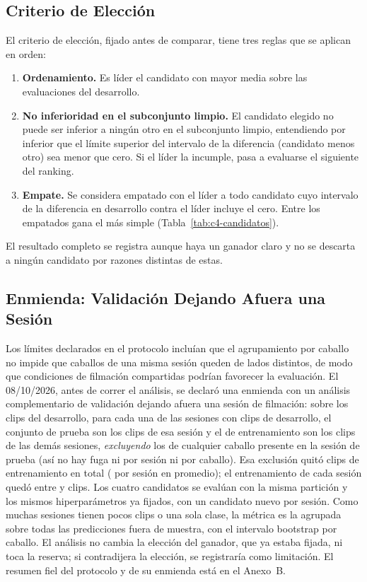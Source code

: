 \subsection{Criterio de Elección}
El criterio de elección, fijado antes de comparar, tiene tres reglas que se aplican en orden:

\begin{enumerate}
  \item \textbf{Ordenamiento.} Es líder el candidato con mayor \fmacro{} media sobre las \Evaluaciones{} evaluaciones del desarrollo.
  \item \textbf{No inferioridad en el subconjunto limpio.} El candidato elegido no puede ser inferior a ningún otro en el subconjunto limpio, entendiendo por inferior que el límite superior del intervalo de la diferencia (candidato menos otro) sea menor que cero. Si el líder la incumple, pasa a evaluarse el siguiente del ranking.
  \item \textbf{Empate.} Se considera empatado con el líder a todo candidato cuyo intervalo de la diferencia en desarrollo contra el líder incluye el cero. Entre los empatados gana el más simple (Tabla~\ref{tab:c4-candidatos}).
\end{enumerate}

El resultado completo se registra aunque haya un ganador claro y no se descarta a ningún candidato por razones distintas de estas.

\subsection{Enmienda: Validación Dejando Afuera una Sesión}
Los límites declarados en el protocolo incluían que el agrupamiento por caballo no impide que caballos de una misma sesión queden de lados distintos, de modo que condiciones de filmación compartidas podrían favorecer la evaluación. El 08/10/2026, antes de correr el análisis, se declaró una enmienda con un análisis complementario de validación dejando afuera una sesión de filmación: sobre los \ClipsDesarrollo{} clips del desarrollo, para cada una de las \SesionesEvaluadas{} sesiones con clips de desarrollo, el conjunto de prueba son los clips de esa sesión y el de entrenamiento son los clips de las demás sesiones, \textit{excluyendo} los de cualquier caballo presente en la sesión de prueba (así no hay fuga ni por sesión ni por caballo). Esa exclusión quitó \ClipsTrainPerdidos{} clips de entrenamiento en total (\ClipsTrainPerdidosMedia{} por sesión en promedio); el entrenamiento de cada sesión quedó entre \ClipsTrainSesionMin{} y \ClipsTrainSesionMax{} clips. Los cuatro candidatos se evalúan con la misma partición y los mismos hiperparámetros ya fijados, con un candidato nuevo por sesión. Como muchas sesiones tienen pocos clips o una sola clase, la métrica es la \fmacro{} agrupada sobre todas las predicciones fuera de muestra, con el intervalo bootstrap por caballo. El análisis no cambia la elección del ganador, que ya estaba fijada, ni toca la reserva; si contradijera la elección, se registraría como limitación. El resumen fiel del protocolo y de su enmienda está en el Anexo~B.

